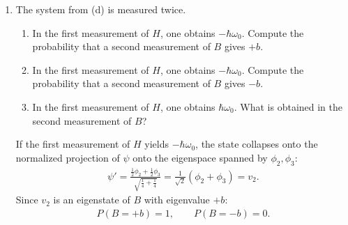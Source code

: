 \documentclass[11pt,a4paper]{scrartcl}
\begin{document}
\begin{enumerate}[label=(\alph*)]
\begin{calculationbox}
        For $B$, rewrite $\psi$ in the common eigenbasis:
        \begin{align*}
            \phi_2 &= \frac{1}{\sqrt{2}}(v_2 + v_3),
            \\
            \phi_3 &= \frac{1}{\sqrt{2}}(v_2 - v_3).
        \end{align*}
        Therefore
        \begin{align*}
            \psi
            &= \frac{1}{\sqrt{2}}v_1 + \frac{1}{2}\cdot\frac{1}{\sqrt{2}}(v_2+v_3)
            + \frac{1}{2}\cdot\frac{1}{\sqrt{2}}(v_2-v_3)
            \\
            &= \frac{1}{\sqrt{2}}v_1 + \frac{1}{\sqrt{2}}v_2.
        \end{align*}
        So
        \begin{align*}
            P(B=b) &= \left|\frac{1}{\sqrt{2}}\right|^2 + \left|\frac{1}{\sqrt{2}}\right|^2 = 1,
            \\
            P(B=-b) &= 0,
            \\
            P(B=3b) &= 0,
        \end{align*}
        since $3b$ is not an eigenvalue of $B$.
    \end{calculationbox}

    \item The system from (d) is measured twice.
    \begin{enumerate}[label=\roman*.]
        \item In the first measurement of $H$, one obtains $-\hbar\omega_0$. Compute the probability that a second measurement of $B$ gives $+b$.
        \item In the first measurement of $H$, one obtains $-\hbar\omega_0$. Compute the probability that a second measurement of $B$ gives $-b$.
        \item In the first measurement of $H$, one obtains $\hbar\omega_0$. What is obtained in the second measurement of $B$?
    \end{enumerate}
    \begin{calculationbox}
        If the first measurement of $H$ yields $-\hbar\omega_0$, the state collapses onto the normalized projection of $\psi$ onto the eigenspace spanned by $\phi_2,\phi_3$:
        \begin{align*}
            \psi' = \frac{\frac{1}{2}\phi_2 + \frac{1}{2}\phi_3}{\sqrt{\frac{1}{4}+\frac{1}{4}}}
            = \frac{1}{\sqrt{2}}(\phi_2+\phi_3)
            = v_2.
        \end{align*}
        Since $v_2$ is an eigenstate of $B$ with eigenvalue $+b$:
        \begin{align*}
            P(B=+b) = 1,
            \qquad
            P(B=-b) = 0.
        \end{align*}


\end{calculationbox}
\end{enumerate}
\end{document}
